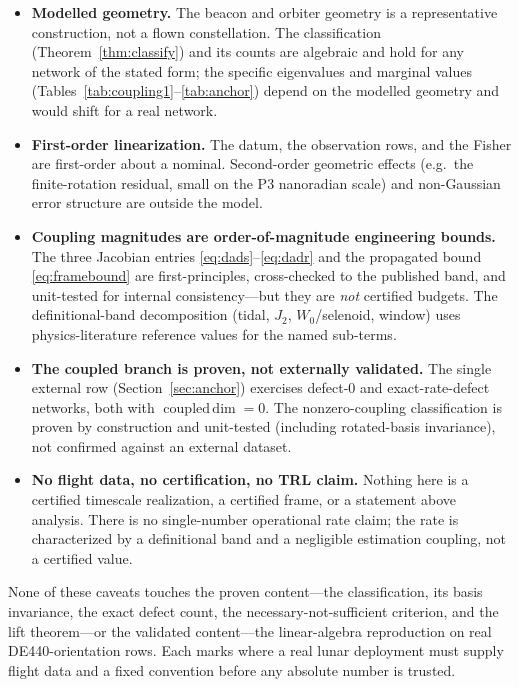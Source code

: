 \begin{itemize}
  \item \textbf{Modelled geometry.} The beacon and orbiter geometry is a representative
  construction, not a flown constellation. The classification (Theorem~\ref{thm:classify})
  and its counts are algebraic and hold for any network of the stated form; the specific
  eigenvalues and marginal values (Tables~\ref{tab:coupling1}--\ref{tab:anchor}) depend on
  the modelled geometry and would shift for a real network.

  \item \textbf{First-order linearization.} The datum, the observation rows, and the Fisher
  are first-order about a nominal. Second-order geometric effects (e.g.\ the finite-rotation
  residual, small on the P3 nanoradian scale) and non-Gaussian error structure are outside
  the model.

  \item \textbf{Coupling magnitudes are order-of-magnitude engineering bounds.} The three
  Jacobian entries \eqref{eq:dads}--\eqref{eq:dadr} and the propagated bound
  \eqref{eq:framebound} are first-principles, cross-checked to the published band, and
  unit-tested for internal consistency---but they are \emph{not} certified budgets. The
  definitional-band decomposition (tidal, $J_2$, $W_0$/selenoid, window) uses
  physics-literature reference values for the named sub-terms.

  \item \textbf{The coupled branch is proven, not externally validated.} The single
  external row (Section~\ref{sec:anchor}) exercises defect-$0$ and exact-rate-defect
  networks, both with $\operatorname{coupled\,dim}=0$. The nonzero-coupling classification is
  proven by construction and unit-tested (including rotated-basis invariance), not confirmed
  against an external dataset.

  \item \textbf{No flight data, no certification, no TRL claim.} Nothing here is a certified
  timescale realization, a certified frame, or a statement above analysis. There is no
  single-number operational rate claim; the rate is characterized by a definitional band and
  a negligible estimation coupling, not a certified value.
\end{itemize}

None of these caveats touches the proven content---the classification, its basis invariance,
the exact defect count, the necessary-not-sufficient criterion, and the lift theorem---or
the validated content---the linear-algebra reproduction on real DE440-orientation rows. Each
marks where a real lunar deployment must supply flight data and a fixed convention before any
absolute number is trusted.
